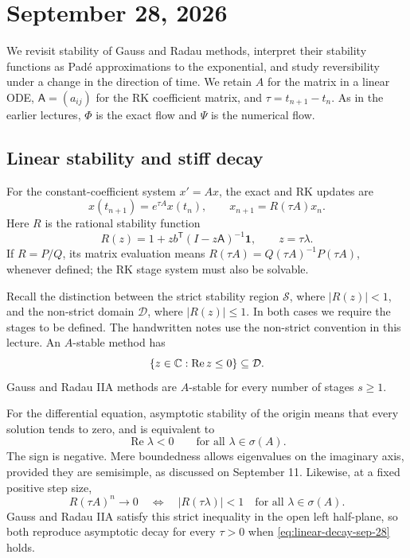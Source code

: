 \section{September 28, 2026}

We revisit stability of Gauss and Radau methods, interpret their
stability functions as Pad\'e approximations to the exponential,
and study reversibility under a change in the direction of time.
We retain \(A\) for the matrix in a linear ODE,
\(\mathsf A=(a_{ij})\) for the RK coefficient matrix, and
\(\tau=t_{n+1}-t_n\). As in the earlier lectures, \(\Phi\) is
the exact flow and \(\Psi\) is the numerical flow.

\subsection{Linear stability and stiff decay}

For the constant-coefficient system \(x'=Ax\), the exact and RK
updates are
\[
 x(t_{n+1})=e^{\tau A}x(t_n),\qquad
 x_{n+1}=R(\tau A)x_n.
\]
Here \(R\) is the rational stability function
\begin{equation}\label{eq:rk-stability-sep-28}
 R(z)=1+z b^{\mathsf T}(I-z\mathsf A)^{-1}\mathbf1,
 \qquad z=\tau\lambda.
\end{equation}
If \(R=P/Q\), its matrix evaluation means
\(R(\tau A)=Q(\tau A)^{-1}P(\tau A)\), whenever defined;
the RK stage system must also be solvable.

Recall the distinction between the strict stability region
\(\mathcal S\), where \(|R(z)|<1\), and the non-strict domain
\(\mathcal D\), where \(|R(z)|\leq1\). In both cases we require
the stages to be defined. The handwritten notes use the non-strict
convention in this lecture. An \(A\)-stable method has
\[
 \{z\in\mathbb{C}:\operatorname{Re}z\leq0\}\subseteq\mathcal D.
\]
Gauss and Radau IIA methods are \(A\)-stable for every number
of stages \(s\geq1\).

For the differential equation, asymptotic stability of the origin
means that every solution tends to zero, and is equivalent to
\begin{equation}\label{eq:linear-decay-sep-28}
 \operatorname{Re}\lambda<0\qquad\text{for all }\lambda\in\sigma(A).
\end{equation}
The sign is negative. Mere boundedness allows eigenvalues on the
imaginary axis, provided they are semisimple, as discussed on
September 11. Likewise, at a fixed positive step size,
\[
 R(\tau A)^n\longrightarrow0
 \quad\Longleftrightarrow\quad
 |R(\tau\lambda)|<1\quad\text{for all }\lambda\in\sigma(A).
\]
Gauss and Radau IIA satisfy this strict inequality in the open
left half-plane, so both reproduce asymptotic decay for every
\(\tau>0\) when \eqref{eq:linear-decay-sep-28} holds.

